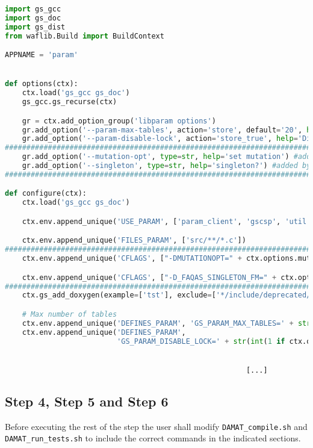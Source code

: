 \begin{lstlisting}[language=python]
import gs_gcc
import gs_doc
import gs_dist
from waflib.Build import BuildContext

APPNAME = 'param'


def options(ctx):
    ctx.load('gs_gcc gs_doc')
    gs_gcc.gs_recurse(ctx)

    gr = ctx.add_option_group('libparam options')
    gr.add_option('--param-max-tables', action='store', default='20', help='Set max table instances')
    gr.add_option('--param-disable-lock', action='store_true', help='Disable table locking')
#####################################################################################################
    gr.add_option('--mutation-opt', type=str, help='set mutation') #added by FAQAS
    gr.add_option('--singleton', type=str, help='singleton?') #added by FAQAS
#####################################################################################################

def configure(ctx):
    ctx.load('gs_gcc gs_doc')

    ctx.env.append_unique('USE_PARAM', ['param_client', 'gscsp', 'util'])

    ctx.env.append_unique('FILES_PARAM', ['src/**/*.c'])
#####################################################################################################
    ctx.env.append_unique('CFLAGS', ["-DMUTATIONOPT=" + ctx.options.mutation_opt]) #added by FAQAS

    ctx.env.append_unique('CFLAGS', ["-D_FAQAS_SINGLETON_FM=" + ctx.options.singleton]) #added by FAQAS
####################################################################################################
    ctx.gs_add_doxygen(example=['tst'], exclude=['*/include/deprecated/param/*'])

    # Max number of tables
    ctx.env.append_unique('DEFINES_PARAM', 'GS_PARAM_MAX_TABLES=' + str(int(ctx.options.param_max_tables)))
    ctx.env.append_unique('DEFINES_PARAM',
                          'GS_PARAM_DISABLE_LOCK=' + str(int(1 if ctx.options.param_disable_lock else 0)))


														[...]

\end{lstlisting}


\subsection{Step 4, Step 5 and Step 6}

Before executing the rest of the step the user shall modify \texttt{DAMAT\_compile.sh} and \texttt{DAMAT\_run\_tests.sh} to include the correct commands in the indicated sections.

